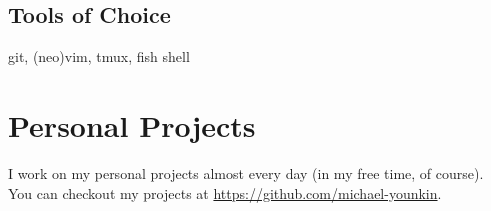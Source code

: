 \documentclass[letterpaper]{article}
\begin{document}
\subsection*{Tools of Choice}
git, (neo)vim, tmux, fish shell

\section*{Personal Projects}
I work on my personal projects almost every day (in my free time, of course).
You can checkout my projects at \href{https://github.com/michael-younkin}{https://github.com/michael-younkin}.

\end{document}
